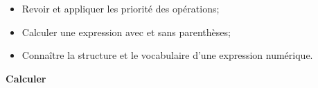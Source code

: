\begin{myobj}
	\begin{itemize}
		\item Revoir et appliquer les priorité des opérations;
		\item Calculer une expression avec et sans parenthèses;
		\item Connaître la structure et le vocabulaire d'une expression numérique.		
		

	\end{itemize}
\end{myobj}

\begin{mycomp}
	\textbf{Calculer} %
	
	
\end{mycomp}